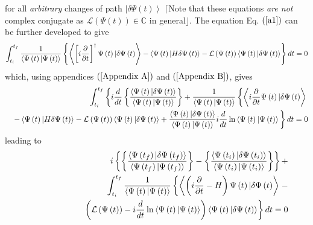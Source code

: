 \documentclass[aps,preprint]{revtex4}
\begin{document}
for all \emph{arbitrary }changes of path $\left\vert \delta \Psi \left(
t\right) \right\rangle $ $\lceil $Note that these equations \emph{are not }%
complex conjugate as $\mathcal{L}\left( \Psi \left( t\right) \right) \in 
\mathbb{C}$ in general$\rfloor $. The equation Eq. $\left( \ref{a1}\right) $
can be further developed to give 
\begin{equation}
\int_{t_{i}}^{t_{f}}\frac{1}{\left\langle \Psi \left( t\right) |\Psi \left(
t\right) \right\rangle }\left\{ \left\langle \left[ i\frac{\partial }{%
\partial t}\right] ^{\dagger }\Psi \left( t\right) |\delta \Psi \left(
t\right) \right\rangle -\left\langle \Psi \left( t\right) |H\delta \Psi
\left( t\right) \right\rangle -\mathcal{L}\left( \Psi \left( t\right)
\right) \left\langle \Psi \left( t\right) |\delta \Psi \left( t\right)
\right\rangle \right\} dt=0
\end{equation}%
which, using appendices $\left( \ref{Appendix A}\right) $ and $\left( \ref%
{Appendix B}\right) $, gives 
\begin{eqnarray}
&&\int_{t_{i}}^{t_{f}}\left\{ i\frac{d}{dt}\left\{ \frac{\left\langle \Psi
\left( t\right) |\delta \Psi \left( t\right) \right\rangle }{\left\langle
\Psi \left( t\right) |\Psi \left( t\right) \right\rangle }\right\} +\frac{1}{%
\left\langle \Psi \left( t\right) |\Psi \left( t\right) \right\rangle }%
\left\{ \left\langle i\frac{\partial }{\partial t}\Psi \left( t\right)
|\delta \Psi \left( t\right) \right\rangle \right. \right.   \notag \\
&&\left. -\left\langle \Psi \left( t\right) |H\delta \Psi \left( t\right)
\right\rangle -\mathcal{L}\left( \Psi \left( t\right) \right) \left\langle
\Psi \left( t\right) |\delta \Psi \left( t\right) \right\rangle +\frac{%
\left\langle \Psi \left( t\right) |\delta \Psi \left( t\right) \right\rangle 
}{\left\langle \Psi \left( t\right) |\Psi \left( t\right) \right\rangle }i%
\frac{d}{dt}\ln \left\langle \Psi \left( t\right) |\Psi \left( t\right)
\right\rangle \overset{}{}\right\} dt=0
\end{eqnarray}%
leading to 
\begin{eqnarray}
&&i\left\{ \left\{ \frac{\left\langle \Psi \left( t_{f}\right) |\delta \Psi
\left( t_{f}\right) \right\rangle }{\left\langle \Psi \left( t_{f}\right)
|\Psi \left( t_{f}\right) \right\rangle }\right\} -\left\{ \frac{%
\left\langle \Psi \left( t_{i}\right) |\delta \Psi \left( t_{i}\right)
\right\rangle }{\left\langle \Psi \left( t_{i}\right) |\Psi \left(
t_{i}\right) \right\rangle }\right\} \right\} +  \notag \\
&&\qquad \int_{t_{i}}^{t_{f}}\frac{1}{\left\langle \Psi \left( t\right)
|\Psi \left( t\right) \right\rangle }\left\{ \left\langle \left( i\frac{%
\partial }{\partial t}-H\right) \Psi \left( t\right) |\delta \Psi \left(
t\right) \right\rangle \right. -  \notag \\
&&\qquad \qquad \qquad \left. \left( \mathcal{L}\left( \Psi \left( t\right)
\right) -i\frac{d}{dt}\ln \left\langle \Psi \left( t\right) |\Psi \left(
t\right) \right\rangle \right) \left\langle \Psi \left( t\right) |\delta
\Psi \left( t\right) \right\rangle \right\} dt=0  \label{a1d}
\end{eqnarray}%
\end{document}
